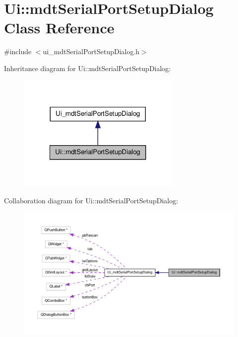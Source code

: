 \hypertarget{class_ui_1_1mdt_serial_port_setup_dialog}{\section{Ui\-:\-:mdt\-Serial\-Port\-Setup\-Dialog Class Reference}
\label{class_ui_1_1mdt_serial_port_setup_dialog}
}


{\ttfamily \#include $<$ui\-\_\-mdt\-Serial\-Port\-Setup\-Dialog.\-h$>$}



Inheritance diagram for Ui\-:\-:mdt\-Serial\-Port\-Setup\-Dialog\-:\nopagebreak
\begin{figure}[H]
\begin{center}
\leavevmode
\includegraphics[width=224pt]{class_ui_1_1mdt_serial_port_setup_dialog__inherit__graph}
\end{center}
\end{figure}


Collaboration diagram for Ui\-:\-:mdt\-Serial\-Port\-Setup\-Dialog\-:\nopagebreak
\begin{figure}[H]
\begin{center}
\leavevmode
\includegraphics[width=350pt]{class_ui_1_1mdt_serial_port_setup_dialog__coll__graph}
\end{center}
\end{figure}
